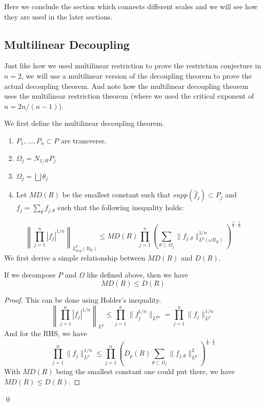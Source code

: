 Here we conclude the section which connects different scales and we will see how they are used in the later sections.

\subsection*{Multilinear Decoupling}
Just like how we used multilinear restriction to prove the restriction conjecture in $n=2$, we will use a multilinear version of the decoupling theorem to prove the actual decoupling theorem. And note how the multilinear decoupling theorem uses the multilinear restriction theorem (where we used the critical exponent of $n=2n/(n-1)$).

We first define the multilinear decoupling theorem.
\begin{enumerate}
    \item $P_1,..., P_n\subset P$ are transverse.
    \item $\Omega_j=N_{1/R}P_j$
    \item $\Omega_j=\bigsqcup\theta_j$
    \item Let $MD(R)$ be the smallest constant such that $supp(\widehat{f}_j)\subset P_j$ and $f_j=\sum_{\theta}f_{j,\theta}$ such that the following inequality holds:
\end{enumerate}
\begin{equation*}
    \left\|\prod_{j=1}^n|f_j|^{1/n} \right\|_{L_{avg}^p(B_R)}\leq MD(R)\prod_{j=1}^n\left(\sum_{\theta\subset\Omega_j}\|f_{j,\theta}\|_{L^p(\omega B_R)}^{1/n} \right)^{\frac{1}{2}\cdot\frac{1}{n}}
\end{equation*}
We first derive a simple relationship between $MD(R)$ and $D(R)$.
\begin{proposition}
    If we decompose $P$ and $\Omega$ like defined above, then we have
    \begin{equation*}
        MD(R)\leq D(R)
    \end{equation*}
\end{proposition}
\begin{proof}
    This can be done using Holder's inequality. 
    \begin{equation*}
        \left\|\prod_{j=1}^n|f_j|^{1/n} \right\|_{L^p}\leq\prod_{j=1}^n\|f_j^{1/n}\|_{L^{pn}}=\prod_{j=1}^n\|f_j\|_{L^p}^{1/n}
    \end{equation*}
    And for the RHS, we have
    \begin{equation*}
        \prod_{j=1}^n\|f_j\|_{L^p}^{1/n}\leq\prod_{j=1}^n\left(D_p(R)\sum_{\theta\subset\Omega_j}\|f_{j,\theta}\|_{L^p}^2 \right)^{\frac{1}{n}\cdot\frac{1}{2}}
    \end{equation*}
    With $MD(R)$ being the smallest constant one could put there, we have $MD(R)\leq D(R)$.
\end{proof}
\qed

